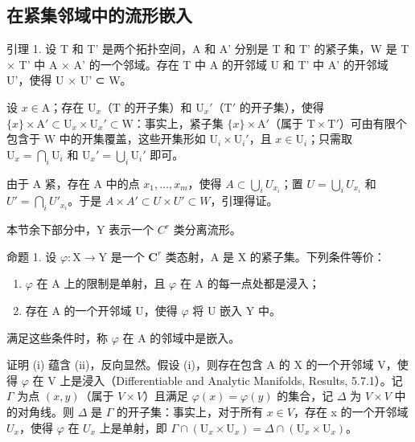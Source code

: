 \subsection{在紧集邻域中的流形嵌入}

引理 1. 设 T 和 T' 是两个拓扑空间，A 和 A' 分别是 T 和 T' 的紧子集，W 是 T × T' 中 A × A' 的一个邻域。存在 T 中 A 的开邻域 U 和 T' 中 A' 的开邻域 U'，使得 U × U' ⊂ W。

设 \(x \in \mathrm{A}\)；存在 \(\mathrm{U}_x\)（\(\mathrm{T}\) 的开子集）和 \(\mathrm{U}_x'\)（\(\mathrm{T}'\) 的开子集），使得 \(\{x\} \times \mathrm{A}' \subset \mathrm{U}_x \times \mathrm{U}_x' \subset \mathrm{W}\)：事实上，紧子集 \(\{x\} \times \mathrm{A}'\)（属于 \(\mathrm{T} \times \mathrm{T}'\)）可由有限个包含于 \(\mathrm{W}\) 中的开集覆盖，这些开集形如 \(\mathrm{U}_i \times \mathrm{U}_i'\)，且 \(x \in \mathrm{U}_i\)；只需取 \(\mathrm{U}_x = \bigcap_i \mathrm{U}_i\) 和 \(\mathrm{U}_x' = \bigcup_i \mathrm{U}_i'\) 即可。

由于 A 紧，存在 A 中的点 \(x_{1},\ldots,x_{m}\)，使得 \(A\subset\bigcup_{i}U_{x_{i}}\)；置 \(U=\bigcup_{i}U_{x_{i}}\) 和 \(U'=\bigcap_{i}U'_{x_{i}}\)。于是 \(A\times A'\subset U\times U'\subset W\)，引理得证。

本节余下部分中，Y 表示一个 \(C^{r}\) 类分离流形。

命题 1. 设 \(\varphi : \mathrm{X} \to \mathrm{Y}\) 是一个 \(\mathbf{C}^r\) 类态射，A 是 \(\mathrm{X}\) 的紧子集。下列条件等价：

\begin{enumerate}
\def\labelenumi{(\roman{enumi})}
\item
  \(\varphi\) 在 A 上的限制是单射，且 \(\varphi\) 在 A 的每一点处都是浸入；
\item
  存在 A 的一个开邻域 U，使得 \(\varphi\) 将 U 嵌入 Y 中。
\end{enumerate}

满足这些条件时，称 \(\varphi\) 在 A 的邻域中是嵌入。

证明 (i) 蕴含 (ii)，反向显然。假设 (i)，则存在包含 A 的 X 的一个开邻域 V，使得 \(\varphi\) 在 V 上是浸入（Differentiable and Analytic Manifolds, Results, 5.7.1）。记 \(\Gamma\) 为点 \((x,y)\)（属于 \(V \times V\)）且满足 \(\varphi(x) = \varphi(y)\) 的集合，记 \(\Delta\) 为 \(V \times V\) 中的对角线。则 \(\Delta\) 是 \(\Gamma\) 的开子集：事实上，对于所有 \(x \in V\)，存在 x 的一个开邻域 \(U_x\)，使得 \(\varphi\) 在 \(U_x\) 上是单射，即 \(\Gamma \cap (\mathrm{U}_x \times \mathrm{U}_x) = \Delta \cap (\mathrm{U}_x \times \mathrm{U}_x)\)。

